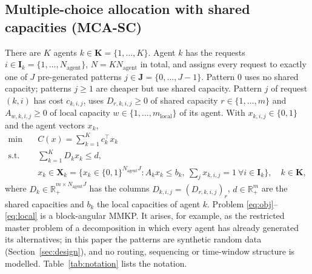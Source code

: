 \documentclass[a4paper,fleqn]{cas-sc}
\begin{document}
\subsection{Multiple-choice allocation with shared capacities (MCA-SC)}
\label{sec:model}
There are $K$ agents $k \in \mathbf{K} = \{1,\dots,K\}$. Agent $k$ has the requests $i \in \mathbf{I}_k = \{1,\dots,N_{\text{agent}}\}$, $N = K N_{\text{agent}}$ in total, and assigns every request to exactly one of $J$ pre-generated patterns $j \in \mathbf{J} = \{0,\dots,J-1\}$. Pattern $0$ uses no shared capacity; patterns $j \ge 1$ are cheaper but use shared capacity. Pattern $j$ of request $(k,i)$ has cost $c_{k,i,j}$, uses $D_{r,k,i,j} \ge 0$ of shared capacity $r \in \{1,\dots,m\}$ and $A_{w,k,i,j} \ge 0$ of local capacity $w \in \{1,\dots,m_{\text{local}}\}$ of its agent. With $x_{k,i,j} \in \{0,1\}$ and the agent vectors $x_k$,
\begin{align}
    \min \quad & C(x) = \sum_{k=1}^{K} c_k^\top x_k \label{eq:obj} \\
    \text{s.t.} \quad & \sum_{k=1}^{K} D_k x_k \le d, \label{eq:coupling} \\
    & x_k \in \mathbf{X}_k = \Big\{ x_k \in \{0,1\}^{N_{\text{agent}} J} : A_k x_k \le b_k,\ \textstyle\sum_{j} x_{k,i,j} = 1 \ \forall i \in \mathbf{I}_k \Big\}, \quad k \in \mathbf{K}, \label{eq:local}
\end{align}
where $D_k \in \mathbb{R}_+^{m \times N_{\text{agent}}J}$ has the columns $D_{k,i,j} = (D_{r,k,i,j})_r$, $d \in \mathbb{R}_+^m$ are the shared capacities and $b_k$ the local capacities of agent $k$. Problem \eqref{eq:obj}--\eqref{eq:local} is a block-angular MMKP. It arises, for example, as the restricted master problem of a decomposition in which every agent has already generated its alternatives; in this paper the patterns are synthetic random data (Section~\ref{sec:design}), and no routing, sequencing or time-window structure is modelled. Table~\ref{tab:notation} lists the notation.
\end{document}
